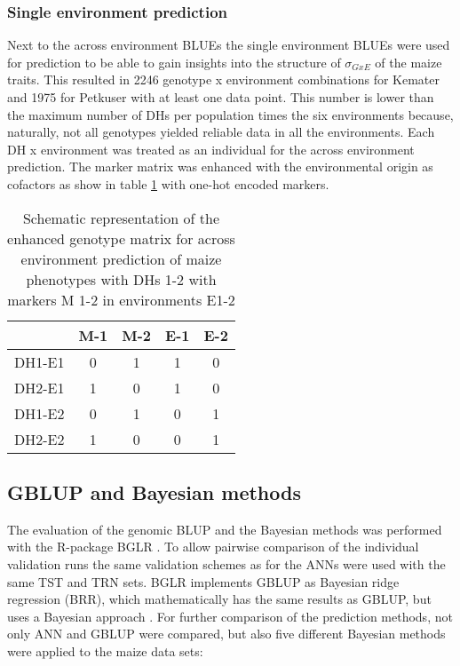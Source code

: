 \subsubsection{Single environment prediction}
Next to the across environment BLUEs the single environment BLUEs were used for prediction
to be able to gain insights into the structure of $\sigma_{GxE}$ of the maize traits. This
resulted in 2246 genotype x environment combinations for Kemater and 1975 for Petkuser
with at least one data point. This number is lower than the maximum number of DHs per
population times the six environments because, naturally, not all genotypes yielded
reliable data in all the environments. Each DH x environment was treated as an individual
for the across environment prediction. The marker matrix was enhanced with the
environmental origin as cofactors as show in table \ref{tab:envmarker} with one-hot
encoded markers.

\onehalfspacing
\begin{table}[H]
 \centering
 \caption[Environmentally enhanced marker matrix]{Schematic representation of the enhanced genotype matrix for across environment prediction of maize phenotypes with DHs 1-2 with markers M 1-2 in environments E1-2}
 \label{tab:envmarker}
 \begin{tabular}{l|cccc}
 \toprule
   & M-1 & M-2 & E-1 & E-2 \\
 \midrule
 DH1-E1 & 0 & 1 & 1 & 0 \\
 DH2-E1 & 1 & 0 & 1 & 0 \\
 DH1-E2 & 0 & 1 & 0 & 1 \\
 DH2-E2 & 1 & 0 & 0 & 1 \\           
 \bottomrule
 \end{tabular}
\end{table}
\doublespacing

\subsection{GBLUP and Bayesian methods} \label{met:blup:bayes}

The evaluation of the genomic BLUP and the Bayesian methods was performed with the
R-package BGLR \cite{BGLR}. To allow pairwise comparison of the individual validation runs
the same validation schemes as for the ANNs were used with the same TST and TRN sets. BGLR
implements GBLUP as Bayesian ridge regression (BRR), which mathematically has the same
results as GBLUP, but uses a Bayesian approach \cite{BGLR}. For further comparison of
the prediction methods, not only ANN and GBLUP were compared, but also five different
Bayesian methods were applied to the maize data sets:

